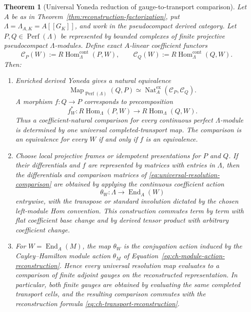 \documentclass[11pt]{article}
\newtheorem{theorem}{Theorem}[section]
\theoremstyle{definition}
\begin{document}
\begin{theorem}[Universal Yoneda reduction of gauge-to-transport comparison]\label{thm:yoneda-gauge-transport}
Let $A$ be as in Theorem~\ref{thm:reconstruction-factorization}, put
$\Lambda=\Lambda_{A,K}=A[[G_K]]$, and work in the pseudocompact derived
category.  Let $P,Q\in\operatorname{Perf}(\Lambda)$ be represented by bounded
complexes of finite projective pseudocompact $\Lambda$-modules.  Define exact
$A$-linear coefficient functors
\[
 \mathcal C_P(W):=R\operatorname{Hom}^{\mathrm{cont}}_{\Lambda}(P,W),
 \qquad
 \mathcal C_Q(W):=R\operatorname{Hom}^{\mathrm{cont}}_{\Lambda}(Q,W).
\]
Then:
\begin{enumerate}[label=\textnormal{(\roman*)}]
\item Enriched derived Yoneda gives a natural equivalence
\begin{equation}\label{eq:yoneda-gauge-transport}
 \operatorname{Map}_{\operatorname{Perf}(\Lambda)}(Q,P)
 \simeq
 \operatorname{Nat}_{A}^{\mathrm{ex}}(\mathcal C_P,\mathcal C_Q).
\end{equation}
A morphism $f:Q\to P$ corresponds to precomposition
\begin{equation}\label{eq:universal-resolution-comparison}
 f_W^*:
 R\operatorname{Hom}_{\Lambda}(P,W)
 \longrightarrow
 R\operatorname{Hom}_{\Lambda}(Q,W).
\end{equation}
Thus a coefficient-natural comparison for every continuous perfect
$\Lambda$-module is determined by one universal completed-transport map.
The comparison is an equivalence for every $W$ if and only if $f$ is an
equivalence.

\item Choose local projective frames or idempotent presentations for $P$ and
$Q$.  If their differentials and $f$ are represented by matrices with entries
in $\Lambda$, then the differentials and comparison matrices of
\eqref{eq:universal-resolution-comparison} are obtained by applying the
continuous coefficient action
\[
 \theta_W:\Lambda\longrightarrow\operatorname{End}_A(W)
\]
entrywise, with the transpose or standard involution dictated by the chosen
left-module Hom convention.  This construction commutes term by term with
flat coefficient base change and by derived tensor product with arbitrary
coefficient change.

\item For $W=\operatorname{End}_A(M)$, the map $\theta_W$ is the conjugation
action induced by the Cayley--Hamilton module action $\theta_M$ of
Equation~\eqref{eq:ch-module-action-reconstruction}.  Hence every universal
resolution map evaluates to a comparison of finite adjoint gauges on the
reconstructed representation.  In particular, both finite gauges are
obtained by evaluating the same completed transport cells, and the resulting
comparison commutes with the reconstruction formula
\eqref{eq:ch-transport-reconstruction}.


\end{enumerate}
\end{theorem}
\end{document}
